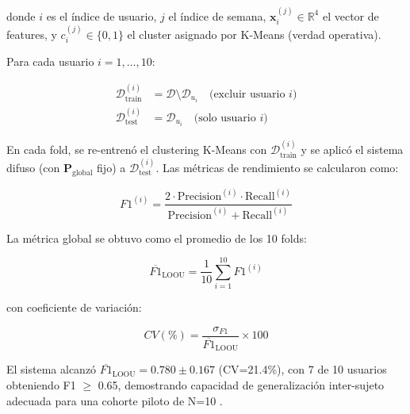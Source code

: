 donde \(i\) es el índice de usuario, \(j\) el índice de semana, \(\mathbf{x}_i^{(j)} \in \mathbb{R}^4\) el vector de features, y \(c_i^{(j)} \in \{0, 1\}\) el cluster asignado por K-Means (verdad operativa).

Para cada usuario \(i = 1, \ldots, 10\):

\begin{align}
\mathcal{D}_{\text{train}}^{(i)} &= \mathcal{D} \setminus \mathcal{D}_{u_i} \quad \text{(excluir usuario } i\text{)} \label{eq:loou_train} \\
\mathcal{D}_{\text{test}}^{(i)} &= \mathcal{D}_{u_i} \quad \text{(solo usuario } i\text{)} \label{eq:loou_test}
\end{align}

En cada fold, se re-entrenó el clustering K-Means con \(\mathcal{D}_{\text{train}}^{(i)}\) y se aplicó el sistema difuso (con \(\mathbf{P}_{\text{global}}\) fijo) a \(\mathcal{D}_{\text{test}}^{(i)}\). Las métricas de rendimiento se calcularon como:

\begin{equation}
F1^{(i)} = \frac{2 \cdot \text{Precision}^{(i)} \cdot \text{Recall}^{(i)}}{\text{Precision}^{(i)} + \text{Recall}^{(i)}}
\label{eq:f1_fold}
\end{equation}

La métrica global se obtuvo como el promedio de los 10 folds:

\begin{equation}
\overline{F1}_{\text{LOOU}} = \frac{1}{10} \sum_{i=1}^{10} F1^{(i)}
\label{eq:f1_loou_global}
\end{equation}

con coeficiente de variación:

\begin{equation}
CV(\%) = \frac{\sigma_{F1}}{\overline{F1}_{\text{LOOU}}} \times 100
\label{eq:cv_loou}
\end{equation}

El sistema alcanzó \(\overline{F1}_{\text{LOOU}} = 0.780 \pm 0.167\) (CV=21.4\%), con 7 de 10 usuarios obteniendo F1 \(\geq\) 0.65, demostrando capacidad de generalización inter-sujeto adecuada para una cohorte piloto de N=10 \citep{Alinia2020}.


